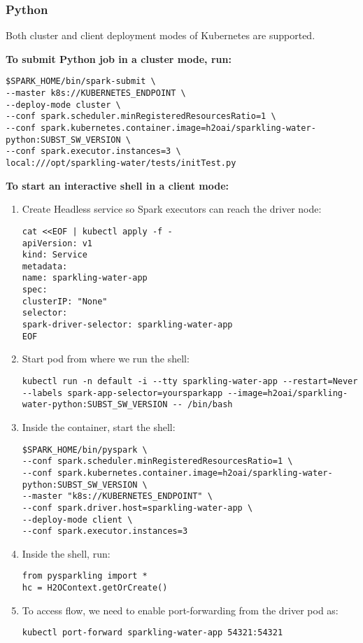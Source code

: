 \subsubsection{Python}

Both cluster and client deployment modes of Kubernetes are supported.

\textbf{To submit Python job in a cluster mode, run:}

\begin{lstlisting}[style=Bash]
$SPARK_HOME/bin/spark-submit \
--master k8s://KUBERNETES_ENDPOINT \
--deploy-mode cluster \
--conf spark.scheduler.minRegisteredResourcesRatio=1 \
--conf spark.kubernetes.container.image=h2oai/sparkling-water-python:SUBST_SW_VERSION \
--conf spark.executor.instances=3 \
local:///opt/sparkling-water/tests/initTest.py
\end{lstlisting}

\textbf{To start an interactive shell in a client mode:}

\begin{enumerate}
    \item Create Headless service so Spark executors can reach the driver node:
    \begin{lstlisting}[style=Bash]
cat <<EOF | kubectl apply -f -
apiVersion: v1
kind: Service
metadata:
name: sparkling-water-app
spec:
clusterIP: "None"
selector:
spark-driver-selector: sparkling-water-app
EOF
    \end{lstlisting}
    \item Start pod from where we run the shell:
    \begin{lstlisting}[style=Bash]
kubectl run -n default -i --tty sparkling-water-app --restart=Never --labels spark-app-selector=yoursparkapp --image=h2oai/sparkling-water-python:SUBST_SW_VERSION -- /bin/bash
    \end{lstlisting}
    \item Inside the container, start the shell:
    \begin{lstlisting}[style=Bash]
$SPARK_HOME/bin/pyspark \
--conf spark.scheduler.minRegisteredResourcesRatio=1 \
--conf spark.kubernetes.container.image=h2oai/sparkling-water-python:SUBST_SW_VERSION \
--master "k8s://KUBERNETES_ENDPOINT" \
--conf spark.driver.host=sparkling-water-app \
--deploy-mode client \
--conf spark.executor.instances=3
    \end{lstlisting}
    \item Inside the shell, run:
    \begin{lstlisting}[style=Python]
from pysparkling import *
hc = H2OContext.getOrCreate()
    \end{lstlisting}
    \item To access flow, we need to enable port-forwarding from the driver pod as:
    \begin{lstlisting}[style=Bash]
kubectl port-forward sparkling-water-app 54321:54321
    \end{lstlisting}
\end{enumerate}

